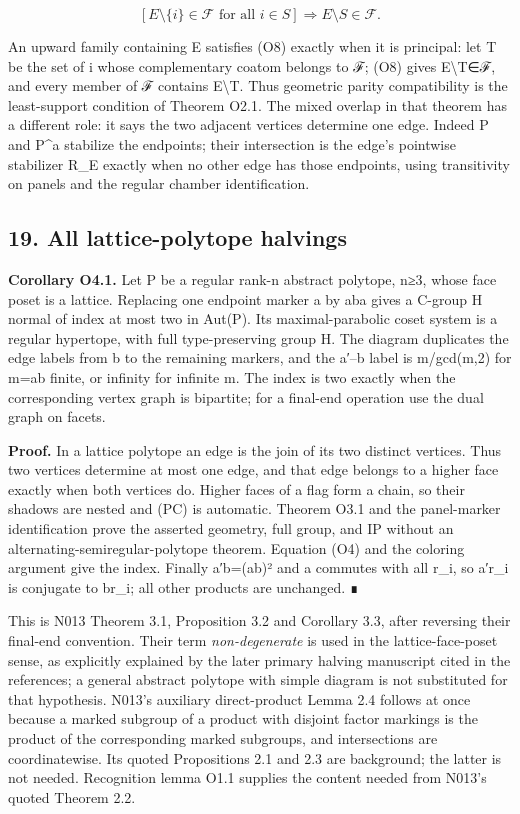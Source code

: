 \documentclass[
  10pt,
  letterpaper,
]{article}
\begin{document}
\[
[E\setminus\{i\}\in\mathcal F\text{ for all }i\in S]
\Longrightarrow E\setminus S\in\mathcal F.
\tag{O8}
\]

An upward family containing E satisfies (O8) exactly when it is
principal: let T be the set of i whose complementary coatom belongs to
ℱ; (O8) gives E\textbackslash T∈ℱ, and every member of ℱ contains
E\textbackslash T. Thus geometric parity compatibility is the
least-support condition of Theorem O2.1. The mixed overlap in that
theorem has a different role: it says the two adjacent vertices
determine one edge. Indeed P and P\^{}a stabilize the endpoints; their
intersection is the edge's pointwise stabilizer R\_E exactly when no
other edge has those endpoints, using transitivity on panels and the
regular chamber identification.

\subsection{19. All lattice-polytope
halvings}\label{all-lattice-polytope-halvings}

\textbf{Corollary O4.1.} Let P be a regular rank-n abstract polytope,
n≥3, whose face poset is a lattice. Replacing one endpoint marker a by
aba gives a C-group H normal of index at most two in Aut(P). Its
maximal-parabolic coset system is a regular hypertope, with full
type-preserving group H. The diagram duplicates the edge labels from b
to the remaining markers, and the a′--b label is m/gcd(m,2) for
m=\textbar ab\textbar{} finite, or infinity for infinite m. The index is
two exactly when the corresponding vertex graph is bipartite; for a
final-end operation use the dual graph on facets.

\textbf{Proof.} In a lattice polytope an edge is the join of its two
distinct vertices. Thus two vertices determine at most one edge, and
that edge belongs to a higher face exactly when both vertices do. Higher
faces of a flag form a chain, so their shadows are nested and (PC) is
automatic. Theorem O3.1 and the panel-marker identification prove the
asserted geometry, full group, and IP without an
alternating-semiregular-polytope theorem. Equation (O4) and the coloring
argument give the index. Finally a′b=(ab)² and a commutes with all r\_i,
so a′r\_i is conjugate to br\_i; all other products are unchanged. ∎

This is N013 Theorem 3.1, Proposition 3.2 and Corollary 3.3, after
reversing their final-end convention. Their term \emph{non-degenerate}
is used in the lattice-face-poset sense, as explicitly explained by the
later primary halving manuscript cited in the references; a general
abstract polytope with simple diagram is not substituted for that
hypothesis. N013's auxiliary direct-product Lemma 2.4 follows at once
because a marked subgroup of a product with disjoint factor markings is
the product of the corresponding marked subgroups, and intersections are
coordinatewise. Its quoted Propositions 2.1 and 2.3 are background; the
latter is not needed. Recognition lemma O1.1 supplies the content needed
from N013's quoted Theorem 2.2.
\end{document}
